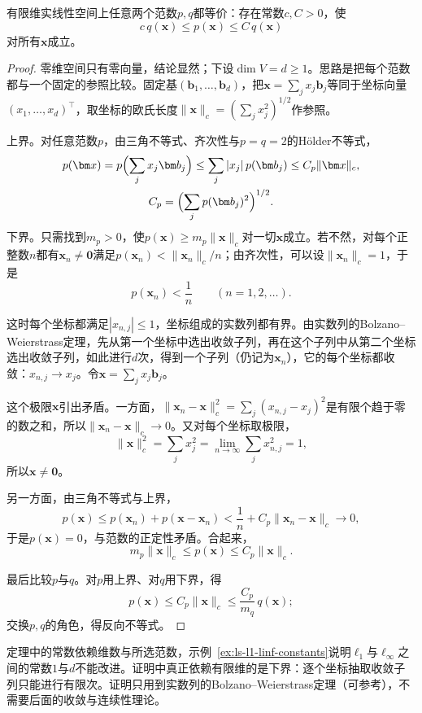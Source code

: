 \begin{theorem}[有限维范数等价]
\label{thm:ls-norm-equivalence}
有限维实线性空间上任意两个范数$p,q$都等价：存在常数$c,C>0$，使
\begin{equation}
 c\,q(\bm x)\leq p(\bm x)\leq C\,q(\bm x)
 \label{eq:ls-norm-equivalence-constants}
\end{equation}
对所有$\bm x$成立。
\end{theorem}
\begin{proof}
零维空间只有零向量，结论显然；下设$\dim V=d\geq1$。思路是把每个范数都与一个固定的参照比较。固定基$(\bm b_1,\ldots,\bm b_d)$，把$\bm x=\sum_jx_j\bm b_j$等同于坐标向量$(x_1,\ldots,x_d)^\top$，取坐标的欧氏长度$\lVert\bm x\rVert_c=(\sum_jx_j^2)^{1/2}$作参照。

上界。对任意范数$p$，由三角不等式、齐次性与$p=q=2$的Hölder不等式，
\[
 \begin{gathered}
 p(\bm x)=p\Bigl(\sum_jx_j\bm b_j\Bigr)\leq\sum_j|x_j|\,p(\bm b_j)\leq C_p\lVert\bm x\rVert_c,\\
 C_p=\Bigl(\sum_jp(\bm b_j)^2\Bigr)^{1/2}.
 \end{gathered}
\]
下界。只需找到$m_p>0$，使$p(\bm x)\geq m_p\lVert\bm x\rVert_c$对一切$\bm x$成立。若不然，对每个正整数$n$都有$\bm x_n\neq\bm0$满足$p(\bm x_n)<\lVert\bm x_n\rVert_c/n$；由齐次性，可以设$\lVert\bm x_n\rVert_c=1$，于是
\[
 p(\bm x_n)<\frac1n\qquad(n=1,2,\ldots).
\]

这时每个坐标都满足$|x_{n,j}|\leq1$，坐标组成的实数列都有界。由实数列的Bolzano--Weierstrass定理，先从第一个坐标中选出收敛子列，再在这个子列中从第二个坐标选出收敛子列，如此进行$d$次，得到一个子列（仍记为$\bm x_n$），它的每个坐标都收敛：$x_{n,j}\to x_j$。令$\bm x=\sum_jx_j\bm b_j$。

这个极限$\bm x$引出矛盾。一方面，$\lVert\bm x_n-\bm x\rVert_c^2=\sum_j(x_{n,j}-x_j)^2$是有限个趋于零的数之和，所以$\lVert\bm x_n-\bm x\rVert_c\to0$。又对每个坐标取极限，
\[
 \lVert\bm x\rVert_c^2=\sum_jx_j^2=\lim_{n\to\infty}\sum_jx_{n,j}^2=1,
\]
所以$\bm x\neq\bm0$。

另一方面，由三角不等式与上界，
\[
 p(\bm x)\leq p(\bm x_n)+p(\bm x-\bm x_n)<\frac1n+C_p\lVert\bm x_n-\bm x\rVert_c\to0,
\]
于是$p(\bm x)=0$，与范数的正定性矛盾。合起来，
\begin{equation}
 m_p\lVert\bm x\rVert_c\leq p(\bm x)\leq C_p\lVert\bm x\rVert_c.
 \label{eq:linear-algebra-finite-norm-equivalence}
\end{equation}

最后比较$p$与$q$。对$p$用上界、对$q$用下界，得
\[
 p(\bm x)\leq C_p\lVert\bm x\rVert_c\leq\frac{C_p}{m_q}\,q(\bm x);
\]
交换$p,q$的角色，得反向不等式。
\end{proof}
定理中的常数依赖维数与所选范数，示例~\ref{ex:ls-l1-linf-constants}说明$\ell_1$与$\ell_\infty$之间的常数$1$与$d$不能改进。证明中真正依赖有限维的是下界：逐个坐标抽取收敛子列只能进行有限次。证明只用到实数列的Bolzano--Weierstrass定理（可参考），不需要后面的收敛与连续性理论。

